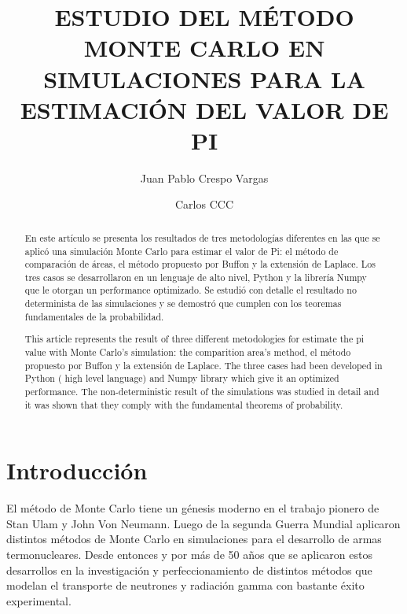 \documentclass{rbf}
\begin{document}
\title{ESTUDIO DEL MÉTODO MONTE CARLO EN SIMULACIONES PARA LA ESTIMACIÓN DEL VALOR DE PI}

\author{Juan Pablo Crespo Vargas\marca{*}}
%


\author{Carlos CCC \marca{**}}
%


\begin{abstract}
\Resumen
En este artículo se presenta los resultados de tres metodologías diferentes en las que se aplicó una simulación Monte Carlo para estimar el valor de Pi: el método de comparación de áreas, el método propuesto por Buffon y la extensión de Laplace. Los tres casos se desarrollaron en un lenguaje de alto nivel, Python y la librería Numpy que le otorgan un performance optimizado. Se estudió con detalle el resultado no determinista de las simulaciones y se demostró que cumplen con los teoremas fundamentales de la probabilidad.



\Abstract
This article represents the result of three different metodologies for estimate the pi value with Monte Carlo's simulation: the comparition area's method, el método propuesto por Buffon y la extensión de Laplace. The three cases had been developed in  Python ( high level language) and Numpy library which give it an optimized performance. The non-deterministic result of the simulations was studied in detail and it was shown that they comply with the fundamental theorems of probability.

\end{abstract}

\maketitle


\section{Introducción}\label{intro}
El método de Monte Carlo tiene un génesis moderno en el trabajo pionero de Stan Ulam y John Von Neumann. Luego de la segunda Guerra Mundial aplicaron distintos métodos de Monte Carlo en simulaciones para el desarrollo de armas termonucleares. Desde entonces y por más de 50 años que se aplicaron estos desarrollos en la investigación y perfeccionamiento de distintos métodos que modelan el transporte de neutrones y radiación gamma con bastante éxito experimental\cite{Kling}. 
\end{document}
